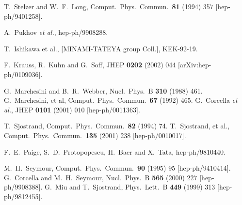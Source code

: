 \documentclass[paper]{JHEP3}
\begin{document}
\begin{thebibliography}{99}
T.~Stelzer and W.~F.~Long,
Comput.\ Phys.\ Commun.\  {\bf 81} (1994) 357
[hep-ph/9401258].

A.~Pukhov {\it et al.},
hep-ph/9908288.

T.~Ishikawa et al.,
[MINAMI-TATEYA group Coll.],
KEK-92-19.

F.~Krauss, R.~Kuhn and G.~Soff,
JHEP {\bf 0202} (2002) 044
[arXiv:hep-ph/0109036].

G.~Marchesini and B.~R.~Webber,
Nucl.\ Phys.\ B {\bf 310} (1988) 461.
G.~Marchesini, et al, 
Comput.\ Phys.\ Commun.\  {\bf 67} (1992) 465.
G.~Corcella {\it et al.},
JHEP {\bf 0101} (2001) 010
[hep-ph/0011363].

T.~Sjostrand,
Comput.\ Phys.\ Commun.\  {\bf 82} (1994) 74.
T.~Sjostrand, et al., 
Comput.\ Phys.\ Commun.\  {\bf 135} (2001) 238
[hep-ph/0010017].

F.~E.~Paige, S.~D.~Protopopescu, H.~Baer and X.~Tata,
hep-ph/9810440.

M.~H.~Seymour,
Comput.\ Phys.\ Commun.\  {\bf 90} (1995) 95
[hep-ph/9410414].
G.~Corcella and M.~H.~Seymour,
Nucl.\ Phys.\ B {\bf 565} (2000) 227
[hep-ph/9908388].
G.~Miu and T.~Sjostrand,
Phys.\ Lett.\ B {\bf 449} (1999) 313
[hep-ph/9812455].


\end{thebibliography}
\end{document}
